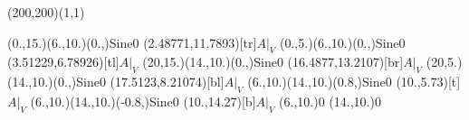\unitlength=1bp%

\begin{feynartspicture}(200,200)(1,1)

\FADiagram{}
\FAProp(0.,15.)(6.,10.)(0.,){Sine}{0}
\FALabel(2.48771,11.7893)[tr]{$A|_V$}
\FAProp(0.,5.)(6.,10.)(0.,){Sine}{0}
\FALabel(3.51229,6.78926)[tl]{$A|_V$}
\FAProp(20,15.)(14.,10.)(0.,){Sine}{0}
\FALabel(16.4877,13.2107)[br]{$A|_V$}
\FAProp(20,5.)(14.,10.)(0.,){Sine}{0}
\FALabel(17.5123,8.21074)[bl]{$A|_V$}
\FAProp(6.,10.)(14.,10.)(0.8,){Sine}{0}
\FALabel(10.,5.73)[t]{$A|_V$}
\FAProp(6.,10.)(14.,10.)(-0.8,){Sine}{0}
\FALabel(10.,14.27)[b]{$A|_V$}
\FAVert(6.,10.){0}
\FAVert(14.,10.){0}
\end{feynartspicture}

